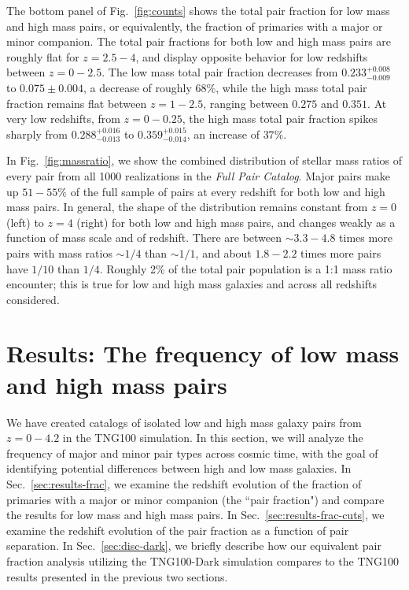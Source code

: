 \documentclass[twocolumn]{aastex631}
\newcommand{\paircat}{\textit{Full Pair Catalog}}
\begin{document}
    The bottom panel of Fig.~\ref{fig:counts} shows the total pair fraction for low mass and high mass pairs, or equivalently, the fraction of primaries with a major or minor companion.
    The total pair fractions for both low and high mass pairs are roughly flat for $z=2.5-4$, and display opposite behavior for low redshifts between $z=0-2.5$. 
    The low mass total pair fraction decreases from $0.233^{+0.008}_{-0.009}$ to $0.075\pm 0.004$, a decrease of roughly $68\%$, while the high mass total pair fraction remains flat between $z=1-2.5$, ranging between $0.275$ and $0.351$.
    At very low redshifts, from $z=0-0.25$, the high mass total pair fraction spikes sharply from $0.288^{+0.016}_{-0.013}$ to $0.359^{+0.015}_{-0.014}$, an increase of $37\%$.

    In Fig.~\ref{fig:massratio}, we show the combined distribution of stellar mass ratios of every pair from all 1000 realizations in the \paircat.
    Major pairs make up $51-55\%$ of the full sample of pairs at every redshift for both low and high mass pairs.
    In general, the shape of the distribution remains constant from $z=0$ (left) to $z=4$ (right) for both low and high mass pairs, and changes weakly as a function of mass scale and of redshift. 
    There are between $\sim3.3-4.8$ times more pairs with mass ratios $\sim1/4$ than $\sim1/1$, and about $1.8-2.2$ times more pairs have $1/10$ than $1/4$. 
    Roughly 2\% of the total pair population is a 1:1 mass ratio encounter; this is true for low and high mass galaxies and across all redshifts considered.  

\section{Results: The frequency of low mass and high mass pairs}
\label{sec:results}

We have created catalogs of isolated low and high mass galaxy pairs from $z=0-4.2$ in the TNG100 simulation. 
In this section, we will analyze the frequency of major and minor pair types across cosmic time, with the goal of identifying potential differences between high and low mass galaxies. 
In Sec.~\ref{sec:results-frac}, we examine the redshift evolution of the fraction of primaries with a major or minor companion (the ``pair fraction") and compare the results for low mass and high mass pairs.
In Sec.~\ref{sec:results-frac-cuts}, we examine the redshift evolution of the pair fraction as a function of pair separation. 
In Sec.~\ref{sec:disc-dark}, we briefly describe how our equivalent pair fraction analysis utilizing the TNG100-Dark simulation compares to the TNG100 results presented in the previous two sections. 
\end{document}
